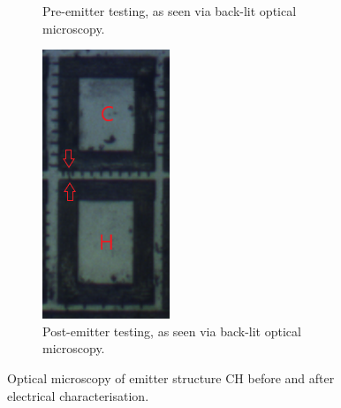 \begin{refsection}
\begin{figure}[H]
\begin{subfigure}[b]{0.315\textwidth}
        \caption{Pre-emitter testing, as seen via back-lit optical microscopy.}
        \label{fig:ch_narrow_afm}
    \end{subfigure}
    \hfill %
    \begin{subfigure}[b]{0.325\textwidth}
        \centering
        \includegraphics[width=\linewidth]{Chapter7/Figs/Raster/ch_narrow_post_testing_afm1.png}
        \caption{Post-emitter testing, as seen via back-lit optical microscopy.}
        \label{fig:ch_narrow_post_afm}
    \end{subfigure}
    \caption{Optical microscopy of emitter structure CH before and after electrical characterisation.}
    \label{fig:ch_narrow_all}
\end{figure}


\end{refsection}
